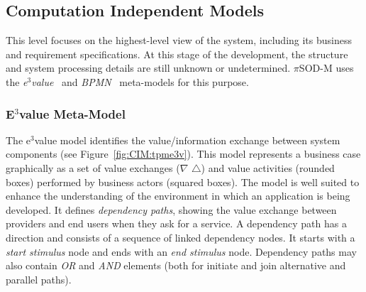 \documentclass{singlecol-new}
\theoremstyle{TH}{
\newtheorem{lemma}{Lemma}
\newtheorem{theorem}[lemma]{Theorem}
\newtheorem{corrolary}[lemma]{Corrolary}
\newtheorem{conjecture}[lemma]{Conjecture}
\newtheorem{proposition}[lemma]{Proposition}
\newtheorem{claim}[lemma]{Claim}
\newtheorem{stheorem}[lemma]{Wrong Theorem}
\newtheorem{algorithm}{Algorithm}
}
\theoremstyle{THrm}{
\newtheorem{definition}{Definition}[section]
\newtheorem{question}{Question}[section]
\newtheorem{remark}{Remark}
\newtheorem{scheme}{Scheme}
}
\theoremstyle{THhit}{
\newtheorem{case}{Case}[section]
}
\theoremstyle{THhsl}{
\newtheorem{example}{Example}
}
\newcommand{\pisodm}[0]{$\pi$SOD-M\xspace}
\begin{document}
\subsection{Computation Independent Models}

This level focuses on the highest-level view of the system, including its business and requirement specifications.
At this stage of the development, the structure and system processing details are still unknown or undetermined.
\pisodm uses the \textit{e$^3$value}~\cite{Gordijn02valuebased} and \textit{BPMN}~\cite{BPMN} meta-models for this purpose.

\subsubsection{E$^3$value Meta-Model}

The e$^3$value model  identifies the value/in\-for\-ma\-tion  exchange between system components (see Figure~\ref{fig:CIM:tpme3v}).
This model  represents a business case graphically as a set of value exchanges  ($\nabla$ $\triangle$) and value activities (rounded boxes)\footnotemark {} performed by business actors (squared boxes).
The model is well suited to enhance the understanding of the environment in which an application is being developed.
It defines \textit{dependency paths}, showing the value exchange between providers and end users when they ask for a service.
A dependency path has a direction and consists of a sequence of linked dependency nodes.
It starts with a \textit{start stimulus} node and ends with an \textit{end stimulus} node.
Dependency paths may also contain \textsl{OR} and \textsl{AND} elements (both for initiate and join alternative and parallel paths).
\end{document}
